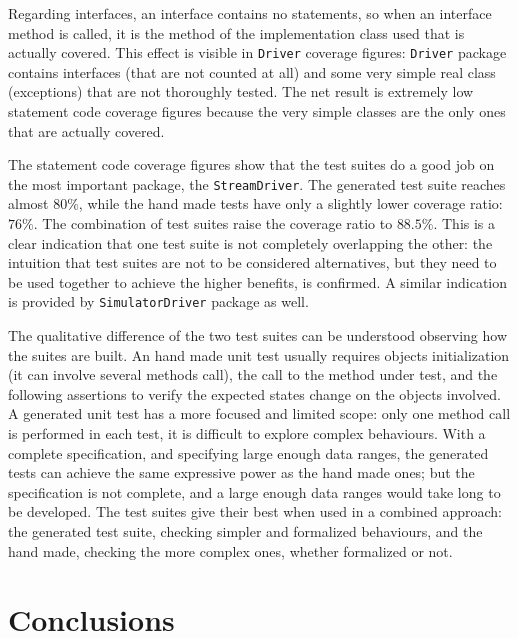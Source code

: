 \documentclass[english]{lni}
\newcommand{\lil}[1]{\texttt{\lstinline|#1|}}
\begin{document}
Regarding interfaces, an interface contains no statements, so when an interface method is called, it is the method of the implementation class used that is actually covered.
This effect is visible in \lil{Driver} coverage figures: \lil{Driver} package contains interfaces (that are not counted at all) and some very simple real class (exceptions) that are not thoroughly tested. 
The net result is extremely low statement code coverage figures because the very simple classes are the only ones that are actually covered. 

The statement code coverage figures show that the test suites do a good job on the most important package, the \lil{StreamDriver}. 
The generated test suite reaches almost $ 80 \% $, while the hand made tests have only a slightly lower coverage ratio: $ 76 \% $. 
The combination of test suites raise the coverage ratio to $ 88.5 \% $. 
This is a clear indication that one test suite is not completely overlapping the other: the intuition that test suites are not to be considered alternatives, but they need to be used together to achieve the higher benefits, is confirmed.
A similar indication is provided by \lil{SimulatorDriver} package as well.

The qualitative difference of the two test suites can be understood observing how the suites are built. 
An hand made unit test usually requires objects initialization (it can involve several methods call), the call to the method under test, and the following assertions to verify the expected states change on the objects involved. 
A generated unit test has a more focused and limited scope: only one method call is performed in each test, it is difficult to explore complex behaviours. 
With a complete specification, and specifying large enough data ranges, the generated tests can achieve the same expressive power as the hand made ones; but the specification is not complete, and a large enough data ranges would take long to be developed.
The test suites give their best when used in a combined approach: the generated test suite, checking simpler and formalized behaviours, and the hand made, checking the more complex ones, whether formalized or not.  



\section{Conclusions}
\label{sec:conclusions}
\end{document}
